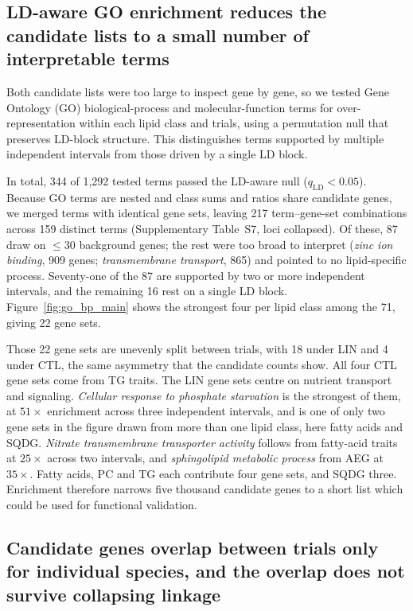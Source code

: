 \documentclass[9pt,twocolumn,twoside]{rilabRxiv}
\begin{document}
\subsection*{LD-aware GO enrichment reduces the candidate lists to a small number of interpretable terms}

Both candidate lists were too large to inspect gene by gene, so we tested Gene Ontology (GO) biological-process and molecular-function terms for over-representation within each lipid class and trials, using a permutation null that preserves LD-block structure. This distinguishes terms supported by multiple independent intervals from those driven by a single LD block.

In total, 344 of 1{,}292 tested terms passed the LD-aware null ($q_{\mathrm{LD}}<0.05$). Because GO terms are nested and class sums and ratios share candidate genes, we merged terms with identical gene sets, leaving 217 term--gene-set combinations across 159 distinct terms (Supplementary Table~S7, loci collapsed). Of these, 87 draw on $\leq 30$ background genes; the rest were too broad to interpret (\textit{zinc ion binding}, 909 genes; \textit{transmembrane transport}, 865) and pointed to no lipid-specific process. Seventy-one of the 87 are supported by two or more independent intervals, and the remaining 16 rest on a single LD block. Figure~\ref{fig:go_bp_main} shows the strongest four per lipid class among the 71, giving 22 gene sets.

Those 22 gene sets are unevenly split between trials, with 18 under LIN and 4 under CTL, the same asymmetry that the candidate counts show. All four CTL gene sets come from TG traits. The LIN gene sets centre on nutrient transport and signaling. \textit{Cellular response to phosphate starvation} is the strongest of them, at $51\times$ enrichment across three independent intervals, and is one of only two gene sets in the figure drawn from more than one lipid class, here fatty acids and SQDG. \textit{Nitrate transmembrane transporter activity} follows from fatty-acid traits at $25\times$ across two intervals, and \textit{sphingolipid metabolic process} from AEG at $35\times$. Fatty acids, PC and TG each contribute four gene sets, and SQDG three. Enrichment therefore narrows five thousand candidate genes to a short list which could be used for functional validation.

\subsection*{Candidate genes overlap between trials only for individual species, and the overlap does not survive collapsing linkage}
\end{document}
